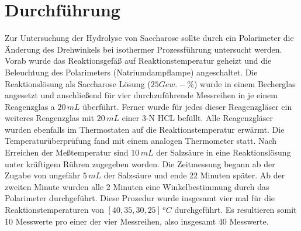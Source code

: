 %
%
\section{Durchführung}
Zur Untersuchung der Hydrolyse von Saccharose sollte durch ein Polarimeter die Änderung des Drehwinkels bei isothermer Prozessführung untersucht werden. Vorab wurde das Reaktionsgefäß auf Reaktionstemperatur geheizt und die Beleuchtung des Polarimeters (Natriumdampflampe) angeschaltet. Die Reaktionslösung als  Saccharose Lösung ($25 Gew.-\%$) wurde in einem Becherglas angesetzt und anschließend für vier durchzuführende Messreihen in je einem Reagenzglas a $20\,\si{mL}$ überführt. Ferner wurde für jedes dieser Reagenzgläser ein weiteres Reagenzglas mit $20\,\si{mL}$ einer 3-N HCL befüllt. Alle Reagenzgläser wurden ebenfalls im Thermostaten auf die Reaktionstemperatur erwärmt. Die Temperaturüberprüfung fand mit einem analogen Thermometer statt. Nach Erreichen der Meßtemperatur sind  $10 \,\si{mL}$ der Salzsäure in eine Reaktionslösung unter kräftigem Rühren zugegeben worden. Die Zeitmessung begann ab der Zugabe von ungefähr $5\,\si{mL}$ der Salzsäure und ende 22 Minuten später. Ab der zweiten Minute wurden alle 2 Minuten eine Winkelbestimmung durch das Polarimeter durchgeführt. Diese Prozedur wurde insgesamt vier mal für die Reaktionstemperaturen von $[40,35,30,25] \,\si{^oC}$ durchgeführt. Es resultieren somit 10 Messwerte pro einer der vier Messreihen, also insgesamt 40 Messwerte.
%
